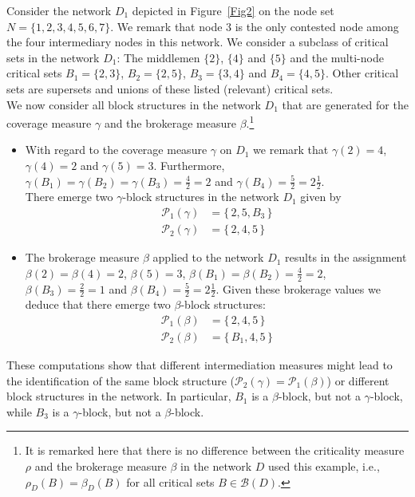 \begin{example} \label{ex:comparison}
Consider the network $D_1$ depicted in Figure~\ref{Fig2} on the node set $N = \{ 1,2,3,4,5,6,7 \}$. We remark that node $3$ is the only contested node among the four intermediary nodes in this network. We consider a subclass of critical sets in the network $D_1$: The middlemen $\{ 2 \}$, $\{ 4 \}$ and $\{ 5 \}$ and the multi-node critical sets $B_1 = \{ 2,3 \}$, $B_2 = \{ 2,5 \}$, $B_3 = \{ 3,4 \}$ and $B_4 = \{ 4,5 \}$. Other critical sets are supersets and unions of these listed (relevant) critical sets.
\\
We now consider all block structures in the network $D_1$ that are generated for the coverage measure $\gamma$ and the brokerage measure $\beta$.\footnote{It is remarked here that there is no difference between the criticality measure $\rho$ and the brokerage measure $\beta$ in the network $D$ used this example, i.e., $\rho_D (B) = \beta_D (B)$ for all critical sets $B \in \mathcal{B} (D)$.}
\begin{itemize}
\item With regard to the coverage measure $\gamma$ on $D_1$ we remark that $\gamma (2) =4$, $\gamma (4) = 2$ and $\gamma (5) =3$. Furthermore, $\gamma (B_1) = \gamma (B_2) = \gamma (B_3) = \tfrac{4}{2}=2$ and $\gamma (B_4) = \tfrac{5}{2}=2 \tfrac{1}{2}$.
\\
There emerge two $\gamma$-block structures in the network $D_1$ given by
\begin{align*}
\mathcal{P}_1 (\gamma ) & = \{ \, 2, 5 , B_3 \, \} \\
\mathcal{P}_2 (\gamma ) & = \{ \, 2, 4 , 5 \, \}
\end{align*}

\item The brokerage measure $\beta$ applied to the network $D_1$ results in the assignment $\beta (2) = \beta (4) =2$, $\beta (5) =3$, $\beta (B_1) = \beta (B_2) = \tfrac{4}{2} =2$, $\beta (B_3) = \tfrac{2}{2}=1$ and $\beta (B_4) = \tfrac{5}{2} = 2 \tfrac{1}{2}$. Given these brokerage values we deduce that there emerge two $\beta$-block structures:
\begin{align*}
\mathcal{P}_1 (\beta ) & = \{ \, 2, 4 , 5 \, \} \\
\mathcal{P}_2 (\beta ) & = \{ \, B_1 , 4 , 5 \, \}
\end{align*}
\end{itemize}
These computations show that different intermediation measures might lead to the identification of the same block structure ($\mathcal{P}_2 (\gamma ) = \mathcal{P}_1 (\beta )$) or different block structures in the network. In particular, $B_1$ is a $\beta$-block, but not a $\gamma$-block, while $B_3$ is a $\gamma$-block, but not a $\beta$-block.
\end{example}

